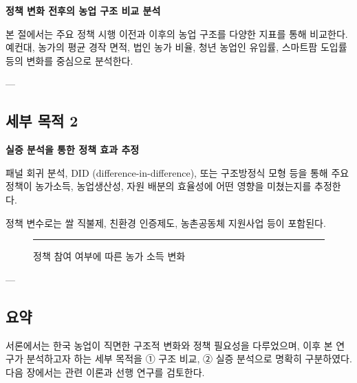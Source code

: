 \textbf{정책 변화 전후의 농업 구조 비교 분석}  

본 절에서는 주요 정책 시행 이전과 이후의 농업 구조를 다양한 지표를 통해 비교한다.  
예컨대, 농가의 평균 경작 면적, 법인 농가 비율, 청년 농업인 유입률, 스마트팜 도입률 등의 변화를 중심으로 분석한다.


---

\subsection{세부 목적 2}

\textbf{실증 분석을 통한 정책 효과 추정}  

패널 회귀 분석, DID (difference-in-difference), 또는 구조방정식 모형 등을 통해  
주요 정책이 농가소득, 농업생산성, 자원 배분의 효율성에 어떤 영향을 미쳤는지를 추정한다.  

정책 변수로는 쌀 직불제, 친환경 인증제도, 농촌공동체 지원사업 등이 포함된다.

\begin{figure}[htbp]
  \centering
  \rule{0.65\linewidth}{5cm}
  \caption{정책 참여 여부에 따른 농가 소득 변화}\label{fig:chapter1_3}
\end{figure}

---

\subsection{요약}

서론에서는 한국 농업이 직면한 구조적 변화와 정책 필요성을 다루었으며,  
이후 본 연구가 분석하고자 하는 세부 목적을 ① 구조 비교, ② 실증 분석으로 명확히 구분하였다.  
다음 장에서는 관련 이론과 선행 연구를 검토한다.
